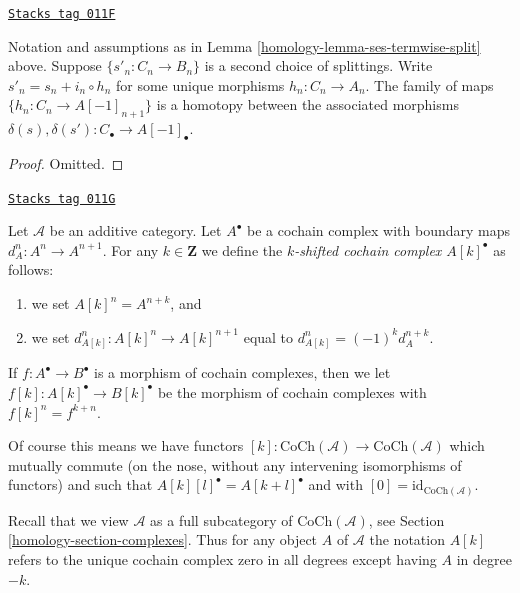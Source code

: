 \begin{lemma}
\label{homology-lemma-ses-termwise-split-homotopy}
\href{https://stacks.math.columbia.edu/tag/011F}{\texttt{Stacks tag 011F}}

Notation and assumptions as in Lemma \ref{homology-lemma-ses-termwise-split} above.
Suppose $\{s'_n : C_n \to B_n\}$ is a second choice of splittings.
Write $s'_n = s_n + i_n \circ h_n$ for some unique
morphisms $h_n : C_n \to A_n$. The family of maps
$\{h_n : C_n \to A[-1]_{n + 1}\}$ is a homotopy between
the associated morphisms
$\delta(s), \delta(s') : C_\bullet \to A[-1]_\bullet$.
\end{lemma}

\begin{proof}
Omitted.
\end{proof}

\begin{definition}
\label{homology-definition-shift-cochain}
\href{https://stacks.math.columbia.edu/tag/011G}{\texttt{Stacks tag 011G}}

Let $\mathcal{A}$ be an additive category.
Let $A^\bullet$ be a cochain complex
with boundary maps $d_A^n : A^n \to A^{n + 1}$.
For any $k \in \mathbf{Z}$ we define the
{\it $k$-shifted cochain complex $A[k]^\bullet$}
as follows:
\begin{enumerate}
\item we set $A[k]^n = A^{n + k}$, and
\item we set $d_{A[k]}^n : A[k]^n \to A[k]^{n + 1}$
equal to $d_{A[k]}^n = (-1)^k d_A^{n + k}$.
\end{enumerate}
If $f : A^\bullet \to B^\bullet$ is a morphism of
cochain complexes, then we let
$f[k] : A[k]^\bullet \to B[k]^\bullet$ be the
morphism of cochain complexes with
$f[k]^n = f^{k + n}$.
\end{definition}

Of course this means we have functors
$[k] : \text{CoCh}(\mathcal{A}) \to \text{CoCh}(\mathcal{A})$
which mutually commute (on the nose, without
any intervening isomorphisms of functors) and
such that $A[k][l]^\bullet = A[k + l]^\bullet$ and
with $[0] = \text{id}_{\text{CoCh}(\mathcal{A})}$.

\medskip\noindent
Recall that we view $\mathcal{A}$ as a full subcategory of
$\text{CoCh}(\mathcal{A})$, see Section \ref{homology-section-complexes}.
Thus for any object $A$ of $\mathcal{A}$ the notation $A[k]$
refers to the unique cochain complex zero in all degrees except having
$A$ in degree $-k$.

